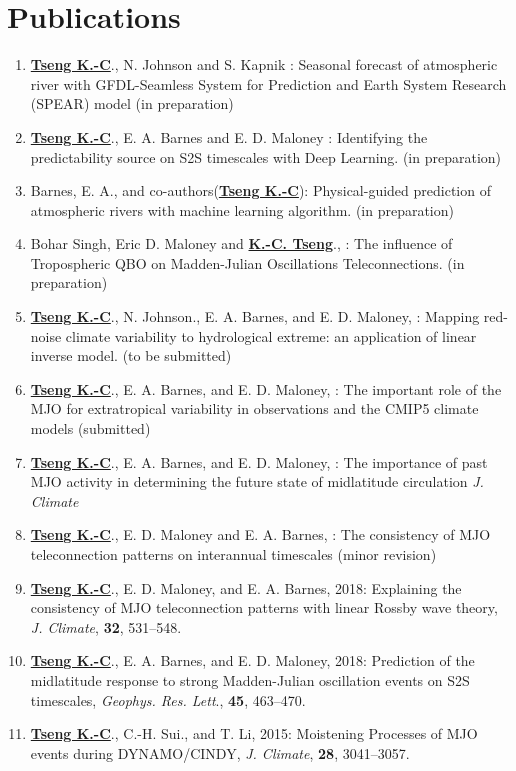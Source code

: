 \documentclass{article}
\begin{document}
\section{\color{airforceblue}Publications}
\begin{enumerate}
    \item \normalsize{\bf{\underline{Tseng K.-C}}}., N. Johnson and S. Kapnik : Seasonal forecast of atmospheric river with GFDL-Seamless System for Prediction and Earth System Research (SPEAR) model (in preparation)\par
    \item \normalsize{\bf{\underline{Tseng K.-C}}}., E. A. Barnes and E. D. Maloney : Identifying the predictability source on S2S timescales with Deep Learning. (in preparation)  \par	
	\item Barnes, E. A., and co-authors(\normalsize{\bf{\underline{Tseng K.-C}}}): Physical-guided prediction of atmospheric rivers with machine learning algorithm. (in preparation)  \par
	\item Bohar Singh, Eric D. Maloney and \normalsize{\bf{\underline{K.-C. Tseng}}}., : The influence of Tropospheric QBO on Madden-Julian Oscillations Teleconnections. (in preparation)  \par

	\item \normalsize{\bf{\underline{Tseng K.-C}}}., N. Johnson., E. A. Barnes, and E. D. Maloney, : Mapping red-noise climate variability to hydrological extreme: an application of linear inverse model. (to be submitted)  
	\item \normalsize{\bf{\underline{Tseng K.-C}}}., E. A. Barnes, and E. D. Maloney, : The important role of the MJO for extratropical variability in observations and the CMIP5 climate models (submitted)  
	\item \normalsize{\bf{\underline{Tseng K.-C}}}., E. A. Barnes, and E. D. Maloney, : The importance of past MJO activity in determining the future state of midlatitude circulation  \textit{J. Climate} 
	\item \normalsize{\bf{\underline{Tseng K.-C}}}., E. D. Maloney and E. A. Barnes, : The consistency of MJO teleconnection patterns on interannual timescales (minor revision) 
	\item \normalsize{\bf{\underline{Tseng K.-C}}}., E. D. Maloney, and E. A. Barnes, 2018: Explaining the consistency of MJO teleconnection patterns with linear Rossby wave theory, \textit{J. Climate}, \normalsize{\bf{32}}, 531--548.
	\item \normalsize{\bf{\underline{Tseng K.-C}}}., E. A. Barnes, and E. D. Maloney, 2018: Prediction of the midlatitude response to strong Madden-Julian oscillation events on S2S timescales, \textit{Geophys. Res. Lett}., \normalsize{\bf{45}}, 463--470. \par
	\item \normalsize{\bf{\underline{Tseng K.-C}}}., C.-H. Sui., and T. Li, 2015: Moistening Processes of MJO events during DYNAMO/CINDY, \textit{J. Climate}, \normalsize{\bf{28}}, 3041--3057.
    \end{enumerate}
\end{document}
